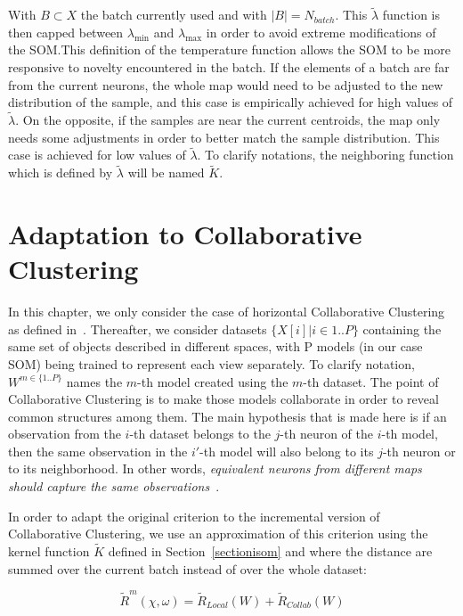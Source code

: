 	With $B \subset X$ the batch currently used and with $|B|=N_{batch}$. This $\widetilde{\lambda}$ function is then capped between $\lambda_{\min}$ and $\lambda_{\max}$ in order to avoid extreme modifications of the SOM.\@ This definition of the temperature function allows the SOM to be more responsive to novelty encountered in the batch. If the elements of a batch are far from the current neurons, the whole map would need to be adjusted to the new distribution of the sample, and this case is empirically achieved for high values of $\widetilde{\lambda}$. On the opposite, if the samples are near the current centroids, the map only needs some adjustments in order to better match the sample distribution. This case is achieved for low values of $\widetilde{\lambda}$. To clarify notations, the neighboring function which is defined by $\widetilde{\lambda}$ will be named $\widetilde{K}$.
	
	\section{Adaptation to Collaborative Clustering}
	In this chapter, we only consider the case of horizontal Collaborative Clustering as defined in~\cite{ghassany2012collaborative}. Thereafter, we consider datasets $\{X[i] | i \in 1..P\}$ containing the same set of objects described in different spaces, with P models (in our case SOM) being trained to represent each view separately. To clarify notation, $W^{m \in \{1..P\}}$ names the $m$-th model created using the $m$-th dataset. The point of Collaborative Clustering is to make those models collaborate in order to reveal common structures among them. The main hypothesis that is made here is if an observation from the $i$-th dataset belongs to the $j$-th neuron of the $i$-th model, then the same observation in the $i'$-th model will also belong to its $j$-th neuron or to its neighborhood. In other words, \textit{equivalent neurons from different maps should capture the same observations}~\cite{ghassany2012collaborative}.
		
	In order to adapt the original criterion to the incremental version of Collaborative Clustering, we use an approximation of this criterion using the kernel function $\widetilde{K}$ defined in Section~\ref{sectionisom} and where the distance are summed over the current batch instead of over the whole dataset:
	
		\begin{equation}
\label{criterion}
		\widetilde{R}^m(\chi, \omega) = \widetilde{R}_{Local}(W) + \widetilde{R}_{Collab}(W)
		\end{equation}
		
